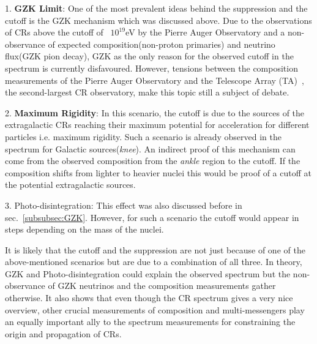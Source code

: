 1. \textbf{GZK Limit}: One of the most prevalent ideas behind the suppression and the cutoff is the GZK mechanism which was discussed above. Due to the observations of CRs above the cutoff of ~$10^{19}$eV by the Pierre Auger Observatory and a non-observance of expected composition(non-proton primaries) and neutrino flux(GZK pion decay), GZK as the only reason for the observed cutoff in the spectrum is currently disfavoured. However, tensions between the composition measurements of the Pierre Auger Observatory and the Telescope Array (TA)~\cite{kawai2008telescope}, the second-largest CR observatory, make this topic still a subject of debate.

2. \textbf{Maximum Rigidity}: In this scenario, the cutoff is due to the sources of the extragalactic CRs reaching their maximum potential for acceleration for different particles i.e. maximum rigidity. Such a scenario is already observed in the spectrum for Galactic sources(\textit{knee}). An indirect proof of this mechanism can come from the observed composition from the \textit{ankle} region to the cutoff. If the composition shifts from lighter to heavier nuclei this would be proof of a cutoff at the potential extragalactic sources. 

3. Photo-disintegration: This effect was also discussed before in sec.~\ref{subsubsec:GZK}. However, for such a scenario the cutoff would appear in steps depending on the mass of the nuclei. 

It is likely that the cutoff and the suppression are not just because of one of the above-mentioned scenarios but are due to a combination of all three. In theory, GZK and Photo-disintegration could explain the observed spectrum but the non-observance of GZK neutrinos and the composition measurements gather otherwise. It also shows that even though the CR spectrum gives a very nice overview, other crucial measurements of composition and multi-messengers play an equally important ally to the spectrum measurements for constraining the origin and propagation of CRs.

